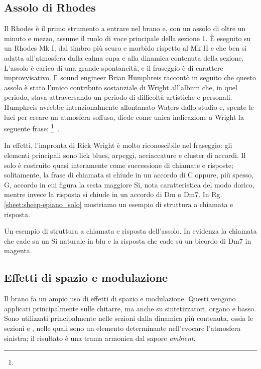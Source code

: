 \documentclass[class=book, crop=false, oneside, 12pt]{standalone}
\begin{document}
    \subsection{Assolo di Rhodes}
    Il Rhodes è il primo strumento a entrare nel brano e, con un assolo di oltre un minuto e mezzo, assume il ruolo di voce principale della sezione 1. È eseguito su un Rhodes Mk I, dal timbro più scuro e morbido rispetto al Mk II e che ben si adatta all'atmosfera dalla calma cupa e alla dinamica contenuta della sezione. L'assolo è carico di una grande spontaneità, e il fraseggio è di carattere improvvisativo. Il sound engineer Brian Humphreis raccontò in seguito che questo assolo è stato l'unico contributo sostanziale di Wright all'album che, in quel periodo, stava attraversando un periodo di difficoltà artistiche e personali. Humphreis avrebbe intenzionalmente allontanato Waters dallo studio e,   spente le luci per creare un atmosfera soffusa, diede come unica indicazione a Wright la seguente frase: \footnote{}~\cite{easlea2022raving}.

    
    In effetti, l'impronta di Rick Wright è molto riconoscibile nel fraseggio: gli elementi principali sono lick blues, arpeggi, acciaccature e cluster di accordi. Il solo è costruito quasi interamente come successione di chiamate e risposte; solitamente, la frase di chiamata si chiude in un accordo di C oppure, più spesso, G, accordo in cui figura la sesta maggiore Si, nota caratteristica del modo dorico, mentre invece la risposta si chiude in un accordo di Dm o Dm7. In Rg.\ref{sheet:sheep-epiano_solo} mostriamo un esempio di struttura a chiamata e risposta.

    \begin{sheet}[htb]
        \centering
        \caption[Un esempio di struttura a chiamata e risposta dell'assolo.]{Un esempio di struttura a chiamata e risposta dell'assolo. In evidenza la chiamata che cade su un Si naturale in blu e la risposta che cade su un bicordo di Dm7 in magenta.}
        \label{sheet:sheep-epiano_solo}
    \end{sheet}

    \subsection{Effetti di spazio e modulazione}
    Il brano fa un ampio uso di effetti di spazio e modulazione. Questi vengono applicati principalmente sulle chitarre, ma anche su sintetizzatori, organo e basso. Sono utilizzati principalmente nelle sezioni dalla dinamica più contenuta, ossia le sezioni  e , nelle quali sono un elemento determinante nell'evocare l'atmosfera sinistra; il risultato è una trama armonica dal sapore \emph{ambient}.
\end{document}
